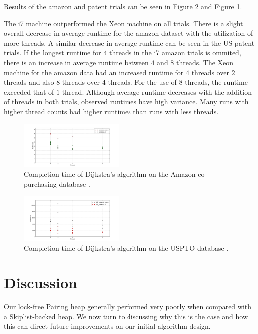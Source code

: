 \documentclass{acm_proc_article-sp}
\begin{document}
Results of the amazon and patent trials can be seen in Figure \ref{fig:ph:amazon} and Figure \ref{fig:ph:patent}.

The i7 machine outperformed the Xeon machine on all trials. 
There is a slight overall decrease in average runtime for the amazon dataset with the utilization of more threads. A similar decrease in average runtime can be seen in the US patent trials. 
If the longest runtime for $4$ threads in the i7 amazon trials is ommited, there is an increase in average runtime between $4$ and $8$ threads. The Xeon machine for the amazon data had an increased runtime for $4$ threads over $2$ threads and also $8$ threads over $4$ threads. For the use of $8$ threads, the runtime exceeded that of $1$ thread. Although average runtime decreases with the addition of threads in both trials, observed runtimes have high variance. Many runs with higher thread counts had higher runtimes than runs with less threads.


\begin{figure}[H]
  \includegraphics[width=0.45\textwidth]{img/amazon.png}
  \caption{Completion time of Dijkstra's algorithm on the Amazon co-purchasing database \cite{leskovec07}.}
  \label{fig:ph:patent}
\end{figure}

\begin{figure}[H]
  \includegraphics[width=0.45\textwidth]{img/US_patents.png}
  \caption{Completion time of Dijkstra's algorithm on the USPTO database \cite{leskovec05}.}
  \label{fig:ph:amazon}
\end{figure}


\section{Discussion}
\label{sec:exp:disc}
Our lock-free Pairing heap generally performed very poorly
when compared with a Skiplist-backed heap. We now turn
to discussing why this is the case and how this
can direct future improvements on our initial
algorithm design.
\end{document}
